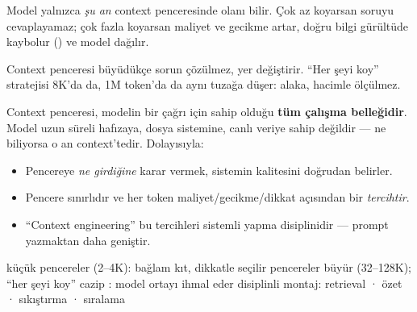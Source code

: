 

Model yalnızca \emph{şu an} context penceresinde olanı bilir. Çok az koyarsan
soruyu cevaplayamaz; çok fazla koyarsan maliyet ve gecikme artar, doğru bilgi
gürültüde kaybolur () ve model dağılır.


Context penceresi büyüdükçe sorun çözülmez, yer değiştirir. ``Her şeyi koy''
stratejisi 8K'da da, 1M token'da da aynı tuzağa düşer: alaka, hacimle ölçülmez.

Context penceresi, modelin bir çağrı için sahip olduğu \textbf{tüm çalışma
belleğidir}. Model uzun süreli hafızaya, dosya sistemine, canlı veriye sahip
değildir --- ne biliyorsa o an context'tedir. Dolayısıyla:

\begin{itemize}
  \item Pencereye \emph{ne girdiğine} karar vermek, sistemin kalitesini doğrudan belirler.
  \item Pencere sınırlıdır ve her token maliyet/gecikme/dikkat açısından bir \emph{tercihtir}.
  \item ``Context engineering'' bu tercihleri sistemli yapma disiplinidir --- prompt yazmaktan daha geniştir.
\end{itemize}

\begin{timeline}
 küçük pencereler (2–4K): bağlam kıt, dikkatle seçilir \tlsep {} pencereler büyür (32–128K); ``her şeyi koy'' cazip \tlsep {} : model ortayı ihmal eder \tlsep {} disiplinli montaj: retrieval · özet · sıkıştırma · sıralama
\end{timeline}

